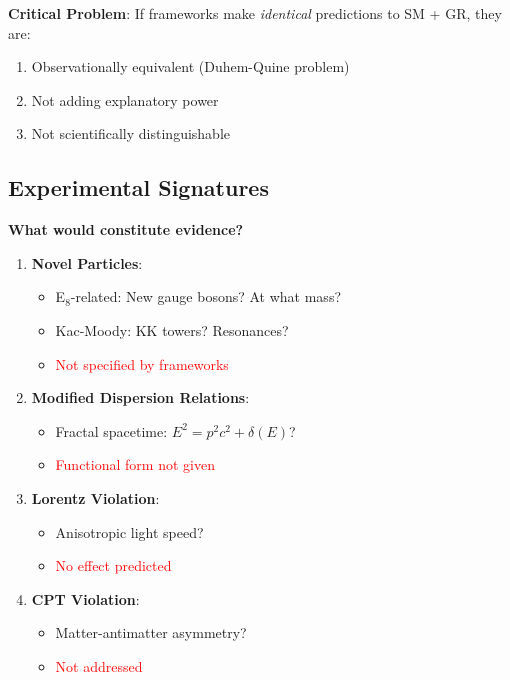 \textbf{Critical Problem}: If frameworks make \textit{identical} predictions to SM + GR, they are:
\begin{enumerate}
    \item Observationally equivalent (Duhem-Quine problem)
    \item Not adding explanatory power
    \item Not scientifically distinguishable
\end{enumerate}

\subsection{Experimental Signatures}

\textbf{What would constitute evidence?}

\begin{enumerate}
    \item \textbf{Novel Particles}:
    \begin{itemize}
        \item E$_8$-related: New gauge bosons? At what mass?
        \item Kac-Moody: KK towers? Resonances?
        \item \textcolor{red}{Not specified by frameworks}
    \end{itemize}

    \item \textbf{Modified Dispersion Relations}:
    \begin{itemize}
        \item Fractal spacetime: $E^2 = p^2 c^2 + \delta(E)$?
        \item \textcolor{red}{Functional form not given}
    \end{itemize}

    \item \textbf{Lorentz Violation}:
    \begin{itemize}
        \item Anisotropic light speed?
        \item \textcolor{red}{No effect predicted}
    \end{itemize}

    \item \textbf{CPT Violation}:
    \begin{itemize}
        \item Matter-antimatter asymmetry?
        \item \textcolor{red}{Not addressed}
    \end{itemize}


\end{enumerate}
